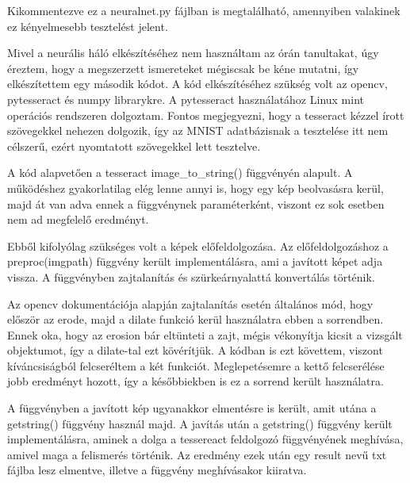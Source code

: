 \documentclass[hidelinks,12pt,a4paper]{report}
\begin{document}

Kikommentezve ez a neuralnet.py fájlban is megtalálható, amennyiben valakinek ez kényelmesebb tesztelést jelent.


Mivel a neurális háló elkészítéséhez nem használtam az órán tanultakat, úgy éreztem, hogy a megszerzett ismereteket mégiscsak be kéne mutatni, így elkészítettem egy második kódot.
A kód elkészítéséhez szükség volt az opencv, pytesseract és numpy librarykre. A pytesseract használatához Linux mint operációs rendszeren dolgoztam. Fontos megjegyezni, hogy a tesseract kézzel írott szövegekkel nehezen dolgozik, így az MNIST adatbázisnak a tesztelése itt nem célszerű, ezért nyomtatott szövegekkel lett tesztelve.

A kód alapvetően a tesseract image\_to\_string() függvényén alapult. A működéshez gyakorlatilag elég lenne annyi is, hogy egy kép beolvasásra kerül, majd át van adva ennek a függvénynek paraméterként, viszont ez sok esetben nem ad megfelelő eredményt.

Ebből kifolyólag szükséges volt a képek előfeldolgozása.
Az előfeldolgozáshoz a preproc(imgpath) függvény került implementálásra, ami a javított képet adja vissza.
A függvényben zajtalanítás és szürkeárnyalattá konvertálás történik.


Az opencv dokumentációja alapján zajtalanítás esetén általános mód, hogy először az erode, majd a dilate funkció kerül használatra ebben a sorrendben.
Ennek oka, hogy az erosion bár eltünteti a zajt, mégis vékonyítja kicsit a vizsgált objektumot, így a dilate-tal ezt kövérítjük.
A kódban is ezt követtem, viszont kíváncsiságból felcseréltem a két funkciót. Meglepetésemre a kettő felcserélése jobb eredményt hozott, így a későbbiekben is ez a sorrend került használatra.


A függvényben a javított kép ugyanakkor elmentésre is került, amit utána a getstring() függvény használ majd.
A javítás után a getstring() függvény került implementálásra, aminek a dolga a tessereact feldolgozó függvényének meghívása, amivel maga a felismerés történik.  Az eredmény ezek után egy result nevű txt fájlba lesz elmentve, illetve a függvény meghívásakor kiiratva.

\end{document}
